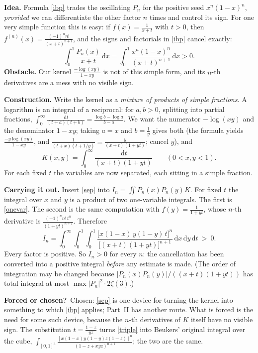 \documentclass[11pt]{article}
\newcommand{\dd}{\,\mathrm d}
\theoremstyle{remark}
\newcommand{\q}[1]{\medskip\noindent\textbf{#1}}
\newcommand{\forced}{\medskip\noindent\textbf{Forced or chosen?}\ }
\begin{document}
\q{Idea.} Formula \eqref{ibp} trades the oscillating $P_n$ for the positive seed $x^n(1-x)^n$,
\emph{provided} we can differentiate the other factor $n$ times and control its sign. For one very
simple function this is easy: if $f(x)=\frac1{x+t}$ with $t>0$, then
$f^{(n)}(x)=\frac{(-1)^nn!}{(x+t)^{n+1}}$, and the signs and factorials in \eqref{ibp} cancel
exactly:
\begin{equation}\label{onevar}
\int_0^1\frac{P_n(x)}{x+t}\dd x=\int_0^1\frac{x^n(1-x)^n}{(x+t)^{n+1}}\dd x>0 .
\end{equation}
\q{Obstacle.} Our kernel $\frac{-\log(xy)}{1-xy}$ is not of this simple form, and its $n$-th
derivatives are a mess with no visible sign.

\q{Construction.} Write the kernel as a \emph{mixture of products of simple fractions}. A logarithm
is an integral of a reciprocal: for $a,b>0$, splitting into partial fractions,
$\int_0^\infty\frac{\dd t}{(t+a)(t+b)}=\frac{\log b-\log a}{b-a}$. We want the numerator
$-\log(xy)$ and the denominator $1-xy$; taking $a=x$ and $b=\frac1y$ gives both (the formula yields $\frac{-y\log(xy)}{1-xy}$, and
$\frac1{(t+x)(t+1/y)}=\frac y{(x+t)(1+yt)}$; cancel $y$), and
\begin{equation}\label{sep}
K(x,y)=\int_0^\infty\frac{\dd t}{(x+t)(1+yt)}\qquad(0<x,y<1).
\end{equation}
For each fixed $t$ the variables are now separated, each sitting in a simple fraction.

\q{Carrying it out.} Insert \eqref{sep} into $I_n=\iint P_n(x)P_n(y)K$. For fixed $t$ the integral
over $x$ and $y$ is a product of two one-variable integrals. The first is \eqref{onevar}. The
second is the same computation with $f(y)=\frac1{1+yt}$, whose $n$-th derivative is
$\frac{(-1)^nn!\,t^n}{(1+yt)^{n+1}}$. Therefore
\begin{equation}\label{triple}
\boxed{\;I_n=\int_0^\infty\!\!\int_0^1\!\!\int_0^1
\frac{\bigl[x(1-x)\,y(1-y)\,t\bigr]^n}{\bigl[(x+t)(1+yt)\bigr]^{n+1}}\dd x\dd y\dd t\ >\ 0 .\;}
\end{equation}
Every factor is positive. So $I_n>0$ for every $n$: the cancellation has been converted into a
positive integral \emph{before} any estimate is made. (The order of integration may be changed
because $|P_n(x)P_n(y)|/((x+t)(1+yt))$ has total integral at most $\max|P_n|^2\cdot2\zeta(3)$.)

\forced Chosen: \eqref{sep} is one device for turning the kernel into something to which
\eqref{ibp} applies; Part~II has another route. What is forced is the need for some such device,
because the $n$-th derivatives of $K$ itself have no visible sign. The substitution $t=\frac{1-z}{yz}$ turns \eqref{triple} into Beukers' original integral over the
cube, $\int_{[0,1]^3}\frac{[x(1-x)y(1-y)z(1-z)]^n}{(1-z+xyz)^{n+1}}$; the two are the same.
\end{document}
